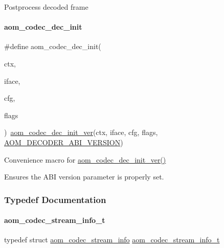 Postprocess decoded frame \mbox{\label{group__decoder_gafdbfca65b19ab1f6d72b32cd01753b9b}} 
\paragraph{\texorpdfstring{aom\+\_\+codec\+\_\+dec\+\_\+init}{aom\_codec\_dec\_init}}
{\footnotesize\ttfamily \#define aom\+\_\+codec\+\_\+dec\+\_\+init(\begin{DoxyParamCaption}\item[{}]{ctx,  }\item[{}]{iface,  }\item[{}]{cfg,  }\item[{}]{flags }\end{DoxyParamCaption})~\hyperlink{group__decoder_gab2bfd2f5517b9452d2c71b7c2b2e8e8d}{aom\+\_\+codec\+\_\+dec\+\_\+init\+\_\+ver}(ctx, iface, cfg, flags, \hyperlink{group__decoder_ga23378c7ca8c361c097181aaaa2a5a734}{A\+O\+M\+\_\+\+D\+E\+C\+O\+D\+E\+R\+\_\+\+A\+B\+I\+\_\+\+V\+E\+R\+S\+I\+ON})}



Convenience macro for \hyperlink{group__decoder_gab2bfd2f5517b9452d2c71b7c2b2e8e8d}{aom\+\_\+codec\+\_\+dec\+\_\+init\+\_\+ver()} 

Ensures the A\+BI version parameter is properly set. 

\subsubsection{Typedef Documentation}
\mbox{\label{group__decoder_gab348c42a78bbbaa6488c84cdf3a28aaa}} 
\paragraph{\texorpdfstring{aom\+\_\+codec\+\_\+stream\+\_\+info\+\_\+t}{aom\_codec\_stream\_info\_t}}
{\footnotesize\ttfamily typedef struct \hyperlink{structaom__codec__stream__info}{aom\+\_\+codec\+\_\+stream\+\_\+info}  \hyperlink{group__decoder_gab348c42a78bbbaa6488c84cdf3a28aaa}{aom\+\_\+codec\+\_\+stream\+\_\+info\+\_\+t}}



